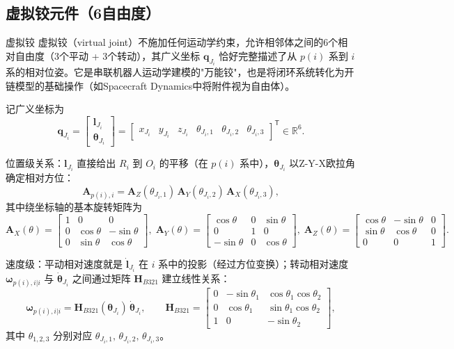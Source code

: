 \documentclass[10pt,a4paper]{book}
\theoremstyle{thmstyle}
\theoremstyle{defstyle}
\theoremstyle{prostyle}
\newcommand{\T}{^{\mathsf{T}}}
\renewcommand{\vec}[1]{\bm{#1}}
\newcommand{\mat}[1]{\bm{#1}}
\newcommand{\R}{\mathbb{R}}
\begin{document}
\subsection{虚拟铰元件（6自由度）}

\begin{mydefinition}{虚拟铰}
虚拟铰（virtual joint）不施加任何运动学约束，允许相邻体之间的6个相对自由度（3个平动 + 3个转动），其广义坐标 $\vec{q}_{J_i}$ 恰好完整描述了从 $p(i)$ 系到 $i$ 系的相对位姿。它是串联机器人运动学建模的"万能铰"，也是将闭环系统转化为开链模型的基础操作（如Spacecraft Dynamics中将附件视为自由体）。
\end{mydefinition}

记广义坐标为
\[
\vec{q}_{J_i} = \begin{bmatrix} \vec{l}_{J_i} \\ \vec{\theta}_{J_i} \end{bmatrix}
= \begin{bmatrix} x_{J_i} & y_{J_i} & z_{J_i} & \theta_{J_i,1} & \theta_{J_i,2} & \theta_{J_i,3} \end{bmatrix}\T\in\R^6.
\]

位置级关系：$\vec{l}_{J_i}$ 直接给出 $R_i$ 到 $O_i$ 的平移（在 $p(i)$ 系中），$\vec{\theta}_{J_i}$ 以Z-Y-X欧拉角确定相对方位：
\begin{equation}
\mat{A}_{p(i),i} = \mat{A}_Z(\theta_{J_i,1})\,\mat{A}_Y(\theta_{J_i,2})\,\mat{A}_X(\theta_{J_i,3}),
\label{eq:euler_angles}
\end{equation}
其中绕坐标轴的基本旋转矩阵为
\begin{equation}
\mat{A}_X(\theta) =
\begin{bmatrix}
1 & 0 & 0 \\
0 & \cos\theta & -\sin\theta \\
0 & \sin\theta & \cos\theta
\end{bmatrix},\;
\mat{A}_Y(\theta) =
\begin{bmatrix}
\cos\theta & 0 & \sin\theta \\
0 & 1 & 0 \\
-\sin\theta & 0 & \cos\theta
\end{bmatrix},\;
\mat{A}_Z(\theta) =
\begin{bmatrix}
\cos\theta & -\sin\theta & 0 \\
\sin\theta & \cos\theta & 0 \\
0 & 0 & 1
\end{bmatrix}.
\label{eq:rot_matrices}
\end{equation}

速度级：平动相对速度就是 $\dot{\vec{l}}_{J_i}$ 在 $i$ 系中的投影（经过方位变换）；转动相对速度 $\vec{\omega}_{p(i),i|i}$ 与 $\dot{\vec{\theta}}_{J_i}$ 之间通过矩阵 $\mat{H}_{B321}$ 建立线性关系：
\[
\vec{\omega}_{p(i),i|i} = \mat{H}_{B321}(\vec{\theta}_{J_i})\,\dot{\vec{\theta}}_{J_i},
\qquad
\mat{H}_{B321} =
\begin{bmatrix}
0 & -\sin\theta_{1} & \cos\theta_{1}\cos\theta_{2} \\
0 & \cos\theta_{1} & \sin\theta_{1}\cos\theta_{2} \\
1 & 0 & -\sin\theta_{2}
\end{bmatrix},
\]
其中 $\theta_{1,2,3}$ 分别对应 $\theta_{J_i,1},\,\theta_{J_i,2},\,\theta_{J_i,3}$。
\end{document}
